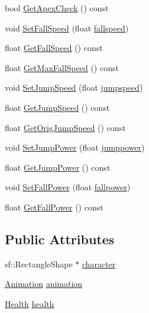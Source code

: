 \begin{DoxyCompactItemize}
\item 
bool \hyperlink{classPlayerObject_a6ec9bab3a7af3a353dbae4db861fee4a}{Get\+Apex\+Check} () const 
\item 
void \hyperlink{classPlayerObject_a4b3506e5454430af8634eecda17a9f70}{Set\+Fall\+Speed} (float \hyperlink{classPlayerObject_a37c477ff51a290d74dba382079474340}{fallspeed})
\item 
float \hyperlink{classPlayerObject_a5f93613a07676e31931780ae1b64965a}{Get\+Fall\+Speed} () const 
\item 
float \hyperlink{classPlayerObject_a980dabd2d14fa5583ed08d9f6349270f}{Get\+Max\+Fall\+Speed} () const 
\item 
void \hyperlink{classPlayerObject_a9fcbe47e9d0cb21d6eae498280087076}{Set\+Jump\+Speed} (float \hyperlink{classPlayerObject_a331066bad9ab1e29d89037bb911609b7}{jumpspeed})
\item 
float \hyperlink{classPlayerObject_a5beb2aab79ca831d12736e068f83c1f8}{Get\+Jump\+Speed} () const 
\item 
float \hyperlink{classPlayerObject_a45b90f5407670b9bc79e9fb5b5618541}{Get\+Orig\+Jump\+Speed} () const 
\item 
void \hyperlink{classPlayerObject_ad253408204429c8514cfc1007a89343f}{Set\+Jump\+Power} (float \hyperlink{classPlayerObject_a3f83ebd349e87ef690ad69e88cf1b9a0}{jumppower})
\item 
float \hyperlink{classPlayerObject_a857d074a00ebc41ff169470b713c42a6}{Get\+Jump\+Power} () const 
\item 
void \hyperlink{classPlayerObject_af095d9c5a94133dff0d05cd261157d61}{Set\+Fall\+Power} (float \hyperlink{classPlayerObject_ae7475f2af3c338f765ff39dacf51a91d}{fallpower})
\item 
float \hyperlink{classPlayerObject_af92460ccdd53dbc2ac844cc36c34908b}{Get\+Fall\+Power} () const 
\end{DoxyCompactItemize}
\subsection*{Public Attributes}
\begin{DoxyCompactItemize}
\item 
sf\+::\+Rectangle\+Shape $\ast$ \hyperlink{classPlayerObject_af8d9f9653a6aab0020abd43c6feeea2e}{character}
\item 
\hyperlink{classAnimation}{Animation} \hyperlink{classPlayerObject_a936b3d503b65e7ab60d8c2946046f72c}{animation}
\item 
\hyperlink{classHealth}{Health} \hyperlink{classPlayerObject_ad09efd50cf54cefed3250636a2fb1013}{health}
\end{DoxyCompactItemize}
